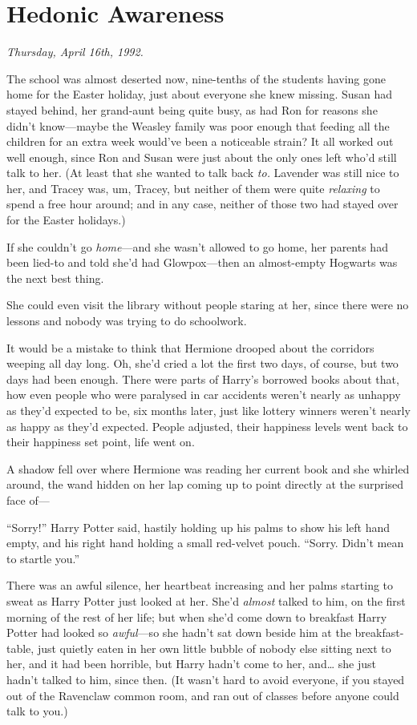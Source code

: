 \chapter{Hedonic Awareness}\label{hedonic-awareness}

\emph{Thursday, April 16th, 1992.}

The school was almost deserted now, nine-tenths of the students having
gone home for the Easter holiday, just about everyone she knew missing.
Susan had stayed behind, her grand-aunt being quite busy, as had Ron for
reasons she didn't know---maybe the Weasley family was poor enough that
feeding all the children for an extra week would've been a noticeable
strain? It all worked out well enough, since Ron and Susan were just
about the only ones left who'd still talk to her. (At least that she
wanted to talk back \emph{to.} Lavender was still nice to her, and
Tracey was, um, Tracey, but neither of them were quite \emph{relaxing}
to spend a free hour around; and in any case, neither of those two had
stayed over for the Easter holidays.)

If she couldn't go \emph{home}---and she wasn't allowed to go home, her
parents had been lied-to and told she'd had Glowpox---then an
almost-empty Hogwarts was the next best thing.

She could even visit the library without people staring at her, since
there were no lessons and nobody was trying to do schoolwork.

It would be a mistake to think that Hermione drooped about the corridors
weeping all day long. Oh, she'd cried a lot the first two days, of
course, but two days had been enough. There were parts of Harry's
borrowed books about that, how even people who were paralysed in car
accidents weren't nearly as unhappy as they'd expected to be, six months
later, just like lottery winners weren't nearly as happy as they'd
expected. People adjusted, their happiness levels went back to their
happiness set point, life went on.

A shadow fell over where Hermione was reading her current book and she
whirled around, the wand hidden on her lap coming up to point directly
at the surprised face of---

``Sorry!'' Harry Potter said, hastily holding up his palms to show his
left hand empty, and his right hand holding a small red-velvet pouch.
``Sorry. Didn't mean to startle you.''

There was an awful silence, her heartbeat increasing and her palms
starting to sweat as Harry Potter just looked at her. She'd
\emph{almost} talked to him, on the first morning of the rest of her
life; but when she'd come down to breakfast Harry Potter had looked so
\emph{awful}---so she hadn't sat down beside him at the breakfast-table,
just quietly eaten in her own little bubble of nobody else sitting next
to her, and it had been horrible, but Harry hadn't come to her,
and\ldots{} she just hadn't talked to him, since then. (It wasn't hard
to avoid everyone, if you stayed out of the Ravenclaw common room, and
ran out of classes before anyone could talk to you.)

